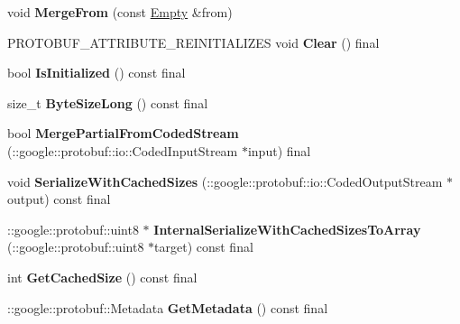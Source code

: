 \begin{DoxyCompactItemize}
\mbox{\label{classtbMessages_1_1Empty_a701838ecf826fbc48eccfac06de42542}} 
void {\bfseries Merge\+From} (const \hyperlink{classtbMessages_1_1Empty}{Empty} \&from)
\item 
\mbox{\label{classtbMessages_1_1Empty_a36881810a97d00b2e8761b12f979376b}} 
P\+R\+O\+T\+O\+B\+U\+F\+\_\+\+A\+T\+T\+R\+I\+B\+U\+T\+E\+\_\+\+R\+E\+I\+N\+I\+T\+I\+A\+L\+I\+Z\+ES void {\bfseries Clear} () final
\item 
\mbox{\label{classtbMessages_1_1Empty_a2c5df2b03499c3cd4aa9c149269a5313}} 
bool {\bfseries Is\+Initialized} () const final
\item 
\mbox{\label{classtbMessages_1_1Empty_a570a9269152154ba74eaf2803f5a1cd9}} 
size\+\_\+t {\bfseries Byte\+Size\+Long} () const final
\item 
\mbox{\label{classtbMessages_1_1Empty_a9efaca91b96abb8b7da28e3e148a9de2}} 
bool {\bfseries Merge\+Partial\+From\+Coded\+Stream} (\+::google\+::protobuf\+::io\+::\+Coded\+Input\+Stream $\ast$input) final
\item 
\mbox{\label{classtbMessages_1_1Empty_a3a49e1903f404bb7792cfee9c8be7062}} 
void {\bfseries Serialize\+With\+Cached\+Sizes} (\+::google\+::protobuf\+::io\+::\+Coded\+Output\+Stream $\ast$output) const final
\item 
\mbox{\label{classtbMessages_1_1Empty_a0725ec9dcc4b3586e07d95f1736f961e}} 
\+::google\+::protobuf\+::uint8 $\ast$ {\bfseries Internal\+Serialize\+With\+Cached\+Sizes\+To\+Array} (\+::google\+::protobuf\+::uint8 $\ast$target) const final
\item 
\mbox{\label{classtbMessages_1_1Empty_ac563d246a710f6a7c71e1861909275cb}} 
int {\bfseries Get\+Cached\+Size} () const final
\item 
\mbox{\label{classtbMessages_1_1Empty_ade840f4ac2ef51c5821d683c70e9a843}} 
\+::google\+::protobuf\+::\+Metadata {\bfseries Get\+Metadata} () const final
\end{DoxyCompactItemize}
